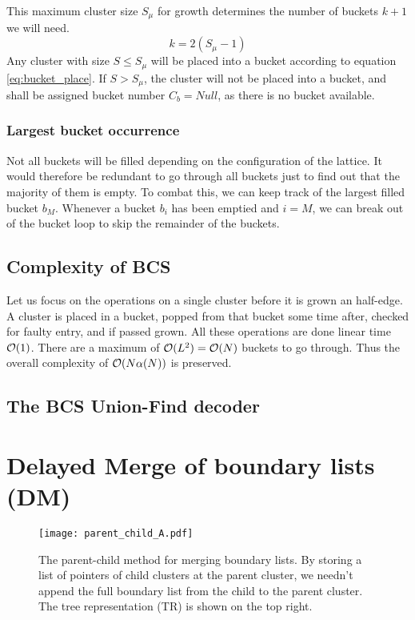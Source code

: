 This maximum cluster size $S_\mu$ for growth determines the number of buckets $k + 1$ we will need.
\begin{equation}\label{eq:bucket_numbuckets}
  k = 2(S_\mu-1)
\end{equation}
Any cluster with size $S\leq S_\mu$ will be placed into a bucket according to equation \ref{eq:bucket_place}. If $S>S_\mu$, the cluster will not be placed into a bucket, and shall be assigned bucket number $C_b=Null$, as there is no bucket available.



\subsubsection{Largest bucket occurrence}
Not all buckets will be filled depending on the configuration of the lattice. It would therefore be redundant to go through all buckets just to find out that the majority of them is empty. To combat this, we can keep track of the largest filled bucket $b_M$. Whenever a bucket $b_i$ has been emptied and $i = M$, we can break out of the bucket loop to skip the remainder of the buckets.

\subsection{Complexity of BCS}
Let us focus on the operations on a single cluster before it is grown an half-edge. A cluster is placed in a bucket, popped from that bucket some time after, checked for faulty entry, and if passed grown. All these operations are done linear time $\mathcal{O}(1)$. There are a maximum of $\mathcal{O}(L^2) = \mathcal{O}(N)$ buckets to go through. Thus the overall complexity of $\mathcal{O}(N\alpha(N))$ is preserved.

\subsection{The BCS Union-Find decoder}




\section{Delayed Merge of boundary lists (DM)}

\begin{figure}
  \centering
  \texttt{[image: parent\_child\_A.pdf]}
  \caption{The parent-child method for merging boundary lists. By storing a list of pointers of child clusters at the parent cluster, we needn't append the full boundary list from the child to the parent cluster. The tree representation (TR) is shown on the top right. } \label{3.fig.parentchildA}
\end{figure}

